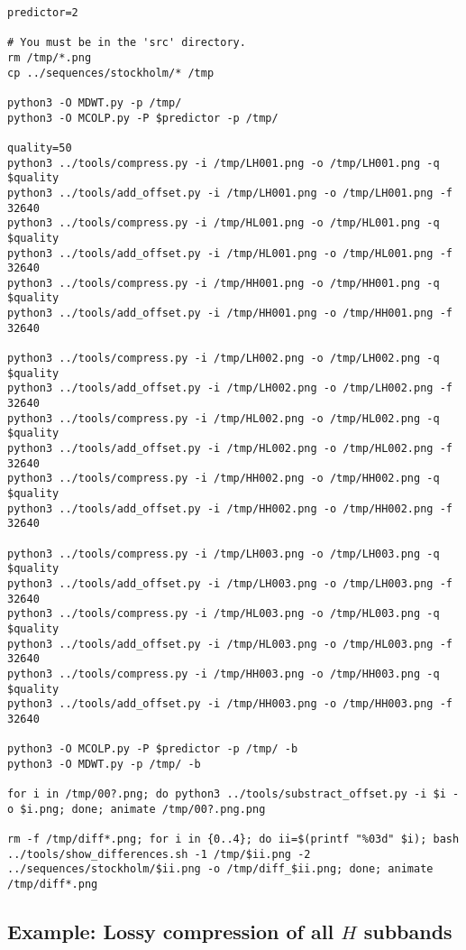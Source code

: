 \begin{verbatim}
predictor=2

# You must be in the 'src' directory.
rm /tmp/*.png
cp ../sequences/stockholm/* /tmp

python3 -O MDWT.py -p /tmp/
python3 -O MCOLP.py -P $predictor -p /tmp/

quality=50
python3 ../tools/compress.py -i /tmp/LH001.png -o /tmp/LH001.png -q $quality
python3 ../tools/add_offset.py -i /tmp/LH001.png -o /tmp/LH001.png -f 32640
python3 ../tools/compress.py -i /tmp/HL001.png -o /tmp/HL001.png -q $quality
python3 ../tools/add_offset.py -i /tmp/HL001.png -o /tmp/HL001.png -f 32640
python3 ../tools/compress.py -i /tmp/HH001.png -o /tmp/HH001.png -q $quality
python3 ../tools/add_offset.py -i /tmp/HH001.png -o /tmp/HH001.png -f 32640

python3 ../tools/compress.py -i /tmp/LH002.png -o /tmp/LH002.png -q $quality
python3 ../tools/add_offset.py -i /tmp/LH002.png -o /tmp/LH002.png -f 32640
python3 ../tools/compress.py -i /tmp/HL002.png -o /tmp/HL002.png -q $quality
python3 ../tools/add_offset.py -i /tmp/HL002.png -o /tmp/HL002.png -f 32640
python3 ../tools/compress.py -i /tmp/HH002.png -o /tmp/HH002.png -q $quality
python3 ../tools/add_offset.py -i /tmp/HH002.png -o /tmp/HH002.png -f 32640

python3 ../tools/compress.py -i /tmp/LH003.png -o /tmp/LH003.png -q $quality
python3 ../tools/add_offset.py -i /tmp/LH003.png -o /tmp/LH003.png -f 32640
python3 ../tools/compress.py -i /tmp/HL003.png -o /tmp/HL003.png -q $quality
python3 ../tools/add_offset.py -i /tmp/HL003.png -o /tmp/HL003.png -f 32640
python3 ../tools/compress.py -i /tmp/HH003.png -o /tmp/HH003.png -q $quality
python3 ../tools/add_offset.py -i /tmp/HH003.png -o /tmp/HH003.png -f 32640

python3 -O MCOLP.py -P $predictor -p /tmp/ -b
python3 -O MDWT.py -p /tmp/ -b

for i in /tmp/00?.png; do python3 ../tools/substract_offset.py -i $i -o $i.png; done; animate /tmp/00?.png.png

rm -f /tmp/diff*.png; for i in {0..4}; do ii=$(printf "%03d" $i); bash ../tools/show_differences.sh -1 /tmp/$ii.png -2 ../sequences/stockholm/$ii.png -o /tmp/diff_$ii.png; done; animate /tmp/diff*.png
\end{verbatim}


\subsection*{Example: Lossy compression of all $H$ subbands}

